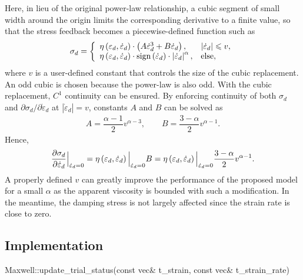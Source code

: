Here, in lieu of the original power-law relationship, a cubic segment of small width around the origin limits the corresponding derivative to a finite value, so that the stress feedback becomes a piecewise-defined function such as
\begin{gather}
\sigma_d=\left\{
\begin{array}{ll}
\eta\left(\varepsilon_d,\dot\varepsilon_d\right)\cdot\left(A\dot{\varepsilon}_d^3+B\dot{\varepsilon}_d\right),&\left\lvert\dot{\varepsilon}_d\right\rvert\leqslant{}v,\\
\eta\left(\varepsilon_d,\dot\varepsilon_d\right)\cdot\text{sign}\left(\dot{\varepsilon}_d\right)\cdot\left\lvert\dot{\varepsilon}_d\right\rvert^{\alpha},&\text{else},
\end{array}
\right.
\end{gather}
where $v$ is a user-defined constant that controls the size of the cubic replacement.
An odd cubic is chosen because the power-law  is also odd.
With the cubic replacement, $C^1$ continuity can be ensured.
By enforcing continuity of both $\sigma_d$ and $\partial\sigma_d/\partial\dot\varepsilon_d$ at $\left\lvert\dot{\varepsilon}_d\right\rvert=v$, constants $A$ and $B$ can be solved as
\begin{gather}
A=\dfrac{\alpha-1}{2}v^{\alpha-3},\qquad
B=\dfrac{3-\alpha}{2}v^{\alpha-1}.
\end{gather}
Hence,
\begin{gather}\label{eq:max_der}
\dfrac{\partial{\sigma_d}}{\partial{\dot{\varepsilon}_d}}\Big\vert_{\dot{\varepsilon}_d=0}=\eta\left(\varepsilon_d,\dot\varepsilon_d\right)\Big\vert_{\dot{\varepsilon}_d=0}B=\eta\left(\varepsilon_d,\dot\varepsilon_d\right)\Big\vert_{\dot{\varepsilon}_d=0}\dfrac{3-\alpha}{2}v^{\alpha-1}.
\end{gather}
A properly defined $v$ can greatly improve the performance of the proposed model for a small $\alpha$ as the apparent viscosity is bounded with such a modification.
In the meantime, the damping stress is not largely affected since the strain rate is close to zero.
\subsection{Implementation}
\begin{cppcode}
Maxwell::update_trial_status(const vec& t_strain, const vec& t_strain_rate)
\end{cppcode}